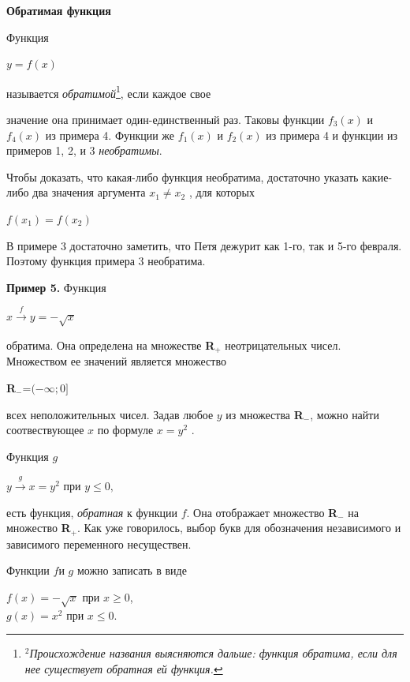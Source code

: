 \begin{minipage}{0.45\textwidth}
\begin{center}
\normalsize{{\bf Обратимая функция}}
\end{center}
\parindent=0.5cm Функция
\begin{center}
$y=f(x)$
\end{center}
называется {\it обратимой}\footnote[$^2$]{$^2${\it Происхождение названия выясняются дальше: функция обратима, если для нее существует обратная ей функция.}}, если каждое свое

\end{minipage}
\hfill
\begin{minipage}{0.45\textwidth}
  значение она принимает один-единственный раз. Таковы функции $f_3(x)$ и $f_4(x)$ из примера 4. Функции же $f_1(x)$ и $f_2(x)$ из примера 4 и функции из примеров 1, 2, и 3 {\it необратимы}.
  
 \parindent=0.5cm Чтобы доказать, что какая-либо функция необратима, достаточно указать какие-либо два значения аргумента $x_1 \neq x_2$ , для которых
  \begin{center}
  $f(x_1) = f(x_2)$
  \end{center}
 
 \parindent=0.5cm В примере 3 достаточно заметить, что Петя дежурит как 1-го, так и 5-го февраля. Поэтому функция примера 3 необратима.
 
 \parindent=0.5cm {\bf Пример 5.} Функция 
  \begin{center}
  $x \xrightarrow{f} y = - \sqrt{x}$ 
  \end{center}
  обратима. Она определена на множестве {\bf R$_+$} неотрицательных чисел. Множеством ее значений является множество 
  \begin{center}
  {\bf R$_-$}=$(-\infty;0]$
  \end{center}
  всех неположительных чисел. Задав любое $y$ из множества {\bf R$_-$}, можно найти соотвествующее $x$ по формуле $x = y^2$ .
  
 \parindent=0.5cm  Функция $g$ 
  \begin{center}
  $ y \xrightarrow{g} x = y^2$ при $ y \leq 0,$ 
  \end{center}
  есть функция, {\it обратная} к функции $f$. Она отображает множество {\bf R$_-$} на множество {\bf R$_+$}. Как уже говорилось, выбор букв для обозначения независимого и зависимого переменного несуществен.
  
 \parindent=0.5cm  Функции $f$и $g$ можно записать в виде 
  \begin{center}
  $f(x) = -\sqrt{x}$ при $x \geq 0$,\\
  \bigskip
  $g(x) = x^2$ при $x \leq 0. $
  \end{center}
  

\end{minipage}
